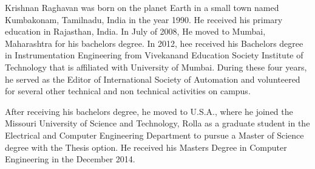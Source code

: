 
\begin{Vita}
Krishnan Raghavan was born on the planet Earth in a small town named Kumbakonam, Tamilnadu, India in the year 1990. He received his primary education in Rajasthan, India. In July of 2008, He moved to Mumbai, Maharashtra for his bachelors degree. In 2012, hee received his Bachelors degree in Instrumentation Engineering from Vivekanand Education Society Institute of Technology that is affiliated with University of Mumbai. During these four years, he served as the Editor of International Society of Automation and volunteered for several other technical and non technical activities on campus.

After receiving his bachelors degree, he moved to U.S.A., where he joined the Missouri University of Science and Technology, Rolla as a graduate student in the Electrical and Computer Engineering Department to pursue a Master of Science degree with the Thesis option. He received his Masters Degree in Computer Engineering in the December 2014. 
\end{Vita}